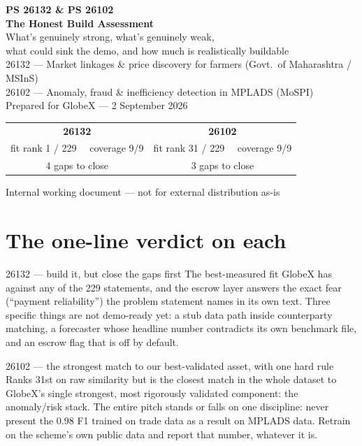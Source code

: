 \documentclass[11pt]{article}
\begin{document}
\begin{titlepage}
\centering
\vspace*{1.6cm}
{\Huge\bfseries\color{gxteal} PS 26132 \& PS 26102}\\[0.4em]
{\Huge\bfseries\color{gxteal} The Honest Build Assessment}\\[1.8em]
{\Large\color{gxslate} What's genuinely strong, what's genuinely weak,}\\[0.3em]
{\Large\color{gxslate} what could sink the demo, and how much is realistically buildable}\\[2.6em]
{\normalsize\color{gxslate} 26132 --- Market linkages \& price discovery for farmers (Govt.\ of Maharashtra / MSInS)}\\[0.2em]
{\normalsize\color{gxslate} 26102 --- Anomaly, fraud \& inefficiency detection in MPLADS (MoSPI)}\\[0.5em]
{\normalsize\color{gxslate} Prepared for GlobeX --- 2 September 2026}\\[2.2em]
\begin{tabular}{cc}
\textbf{\color{gxteal}\Large 26132} & \textbf{\color{gxteal}\Large 26102} \\
{\small fit rank 1 / 229 \ \ coverage 9/9} & {\small fit rank 31 / 229 \ \ coverage 9/9} \\[0.3em]
{\small 4 gaps to close} & {\small 3 gaps to close} \\
\end{tabular}
\vfill
{\footnotesize\color{gxslate} Internal working document --- not for external distribution as-is}
\end{titlepage}

\section*{The one-line verdict on each}
\begin{callout}{26132 --- build it, but close the gaps first}
The best-measured fit GlobeX has against any of the 229 statements, and the escrow layer answers the exact
fear (``payment reliability'') the problem statement names in its own text. Three specific things are not
demo-ready yet: a stub data path inside counterparty matching, a forecaster whose headline number
contradicts its own benchmark file, and an escrow flag that is off by default.
\end{callout}
\begin{callout}{26102 --- the strongest match to our best-validated asset, with one hard rule}
Ranks 31st on raw similarity but is the closest match in the whole dataset to GlobeX's single strongest,
most rigorously validated component: the anomaly/risk stack. The entire pitch stands or falls on one
discipline: never present the 0.98 F1 trained on trade data as a result on MPLADS data. Retrain on the
scheme's own public data and report that number, whatever it is.
\end{callout}
\end{document}
